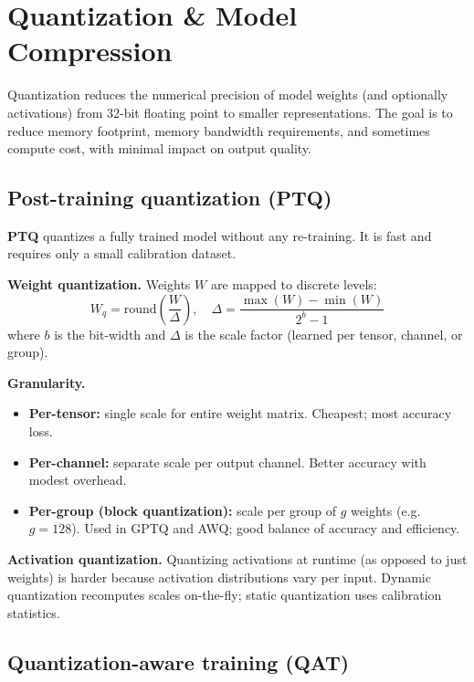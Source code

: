 
\section{Quantization \& Model Compression}

Quantization reduces the numerical precision of model weights (and optionally
activations) from 32-bit floating point to smaller representations. The goal is to
reduce memory footprint, memory bandwidth requirements, and sometimes compute cost,
with minimal impact on output quality.

\subsection{Post-training quantization (PTQ)}

\textbf{PTQ} quantizes a fully trained model without any re-training. It is fast and
requires only a small calibration dataset.

\textbf{Weight quantization.} Weights $W$ are mapped to discrete levels:
\[
  W_q = \text{round}\!\left(\frac{W}{\Delta}\right), \quad
  \Delta = \frac{\max(W) - \min(W)}{2^b - 1}
\]
where $b$ is the bit-width and $\Delta$ is the scale factor (learned per tensor,
channel, or group).

\textbf{Granularity.}
\begin{itemize}
  \item \textbf{Per-tensor:} single scale for entire weight matrix. Cheapest; most
    accuracy loss.
  \item \textbf{Per-channel:} separate scale per output channel. Better accuracy with
    modest overhead.
  \item \textbf{Per-group (block quantization):} scale per group of $g$ weights
    (e.g.\ $g=128$). Used in GPTQ and AWQ; good balance of accuracy and efficiency.
\end{itemize}

\textbf{Activation quantization.} Quantizing activations at runtime (as opposed to
just weights) is harder because activation distributions vary per input. Dynamic
quantization recomputes scales on-the-fly; static quantization uses calibration
statistics.

\subsection{Quantization-aware training (QAT)}

